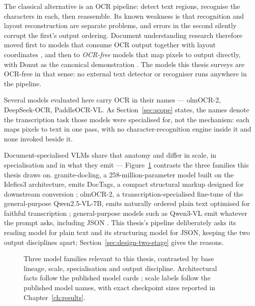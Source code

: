 The classical alternative is an \ac{OCR} pipeline: detect text regions, recognise the
characters in each, then reassemble. Its known weakness is that recognition and layout
reconstruction are separate problems, and errors in the second silently corrupt the
first's output ordering. Document understanding research therefore moved first to models
that consume \ac{OCR} output together with layout coordinates
\parencite{huang2022layoutlmv3}, and then to \emph{\ac{OCR}-free} models that map pixels to
output directly, with Donut as the canonical demonstration \parencite{kim2022donut}. The
models this thesis surveys are \ac{OCR}-free in that sense: no external text detector or
recogniser runs anywhere in the pipeline.

Several models evaluated here carry \ac{OCR} in their names --- olmOCR-2, DeepSeek-OCR,
PaddleOCR-VL. As Section~\ref{sec:scope} states, the names denote the transcription task
those models were specialised for, not the mechanism: each maps pixels to text in one
pass, with no character-recognition engine inside it and none invoked beside it.

Document-specialised \acp{VLM} share that anatomy and differ in scale, in specialisation
and in what they emit --- Figure~\ref{fig:cohort-comparison} contrasts the three families
this thesis draws on. granite-docling, a 258-million-parameter model built on the Idefics3
architecture, emits DocTags,
a compact structural markup designed for downstream conversion \parencite{granitedocling,
docling2025}; olmOCR-2, a transcription-specialised fine-tune of the general-purpose
Qwen2.5-VL-7B, emits naturally ordered plain text optimised for faithful
transcription \parencite{olmocr2}; general-purpose models such as Qwen3-VL emit whatever the
prompt asks, including \ac{JSON} \parencite{qwen3vl}. This thesis's pipeline deliberately
asks its reading model for plain text and its structuring model for \ac{JSON}, keeping
the two output disciplines apart; Section~\ref{sec:design-two-stage} gives the reasons.

\begin{figure}[htbp]
  \centering
  
  \caption[Three model families, one anatomy]{Three model families relevant to this
  thesis, contrasted by base lineage, scale, specialisation and output discipline.
  Architectural facts follow the published model cards \parencite{granitedocling,olmocr2,qwen3vl};
  scale labels follow the published model names, with exact checkpoint sizes reported in
  Chapter~\ref{ch:results}.}
  \label{fig:cohort-comparison}
\end{figure}

